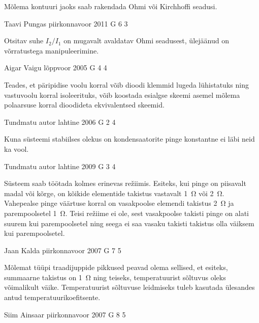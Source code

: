 \documentclass[11pt]{article}
\begin{document}
{{\ifHint
Mõlema kontuuri jaoks saab rakendada Ohmi või Kirchhoffi
seadusi.
\fi
}

{Taavi Pungas} %
{piirkonnavoor} %
{2011} %
{G 6} %
{3} %
{

\ifHint
Otsitav suhe $I_2/I_1$ on mugavalt avaldatav Ohmi seadusest, ülejäänud on võrratustega manipuleerimine.
\fi
}

{Aigar Vaigu} %
{lõppvoor} %
{2005} %
{G 4} %
{4} %
{

\ifHint
Teades, et päripidise voolu korral võib dioodi klemmid lugeda lühistatuks ning vastuvoolu korral isoleerituks, võib koostada esialgse skeemi asemel mõlema polaarsuse korral dioodideta ekvivalentsed skeemid.
\fi
}

{Tundmatu autor} %
{lahtine} %
{2006} %
{G 2} %
{4} %
{

\ifHint
Kuna süsteemi stabiilses olekus on kondensaatorite pinge konstantne ei läbi neid ka vool.
\fi
}

{Tundmatu autor} %
{lahtine} %
{2009} %
{G 3} %
{4} %
{

\ifHint
Süsteem saab töötada kolmes erinevas režiimis. Esiteks, kui pinge on piisavalt madal või kõrge, on kõikide elementide takistus vastavalt \SI{1}{\ohm} või \SI{2}{\ohm}. Vahepealse pinge väärtuse korral on vasakpoolse elemendi takistus \SI{2}{\ohm} ja parempoolsetel \SI{1}{\ohm}. Teisi režiime ei ole, sest vasakpoolse takisti pinge on alati suurem kui parempoolsetel ning seega ei saa vasaku takisti takistus olla väiksem kui parempoolsetel.
\fi
}

{Jaan Kalda} %
{piirkonnavoor} %
{2007} %
{G 7} %
{5} %
{

\ifHint
Mõlemat tüüpi traadijuppide pikkused peavad olema sellised, et esiteks, summaarne takistus on \SI{1}{\ohm} ning teiseks, temperatuurist sõltuvus oleks võimalikult väike. Temperatuurist sõltuvuse leidmiseks tuleb kasutada ülesandes antud temperatuurikoefitsente.
\fi
}

{Siim Ainsaar} %
{piirkonnavoor} %
{2007} %
{G 8} %
{5} %
{

}}
\end{document}
